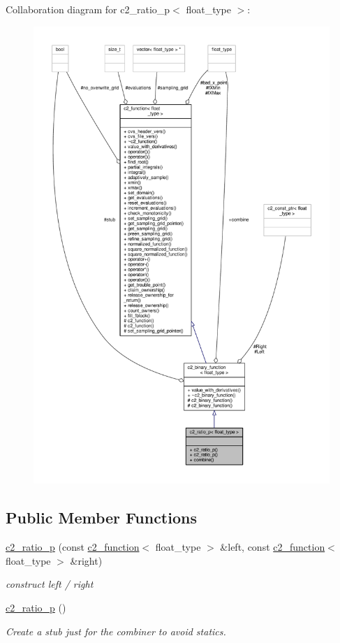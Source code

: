 Collaboration diagram for c2\+\_\+ratio\+\_\+p$<$ float\+\_\+type $>$\+:
\nopagebreak
\begin{figure}[H]
\begin{center}
\leavevmode
\includegraphics[width=350pt]{classc2__ratio__p__coll__graph}
\end{center}
\end{figure}
\subsection*{Public Member Functions}
\begin{DoxyCompactItemize}
\item 
\hyperlink{classc2__ratio__p_a0052c51dbd58b6740f9d067bd09936c5}{c2\+\_\+ratio\+\_\+p} (const \hyperlink{classc2__function}{c2\+\_\+function}$<$ float\+\_\+type $>$ \&left, const \hyperlink{classc2__function}{c2\+\_\+function}$<$ float\+\_\+type $>$ \&right)
\begin{DoxyCompactList}\small\item\em construct {\itshape left} / {\itshape right} \end{DoxyCompactList}\item 
\hyperlink{classc2__ratio__p_ab0f4ee032eee12c495dd1aaa84b767d7}{c2\+\_\+ratio\+\_\+p} ()
\begin{DoxyCompactList}\small\item\em Create a stub just for the combiner to avoid statics. \end{DoxyCompactList}\end{DoxyCompactItemize}
